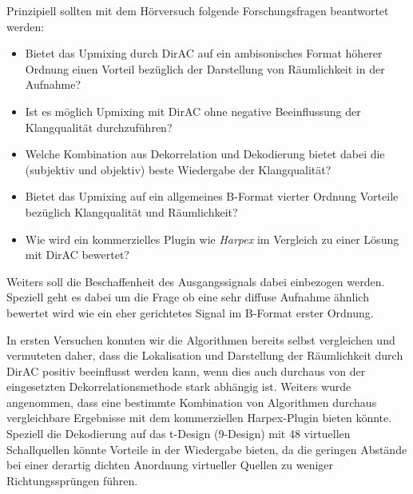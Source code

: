 Prinzipiell sollten mit dem Hörversuch folgende Forschungsfragen beantwortet werden:

\begin{itemize}
	\item Bietet das Upmixing durch DirAC auf ein ambisonisches Format höherer Ordnung einen Vorteil bezüglich der Darstellung von Räumlichkeit in der Aufnahme?
	\item Ist es möglich Upmixing mit DirAC ohne negative Beeinflussung der Klangqualität durchzuführen?
	\item Welche Kombination aus Dekorrelation und Dekodierung bietet dabei die (subjektiv und objektiv) beste Wiedergabe der Klangqualität?
	\item Bietet das Upmixing auf ein allgemeines B-Format vierter Ordnung Vorteile bezüglich Klangqualität und Räumlichkeit?
	\item Wie wird ein kommerzielles Plugin wie \textit{Harpex} im Vergleich zu einer Lösung mit DirAC bewertet?
\end{itemize}

Weiters soll die Beschaffenheit des Ausgangssignals dabei einbezogen werden. Speziell geht es dabei um die Frage ob eine sehr diffuse Aufnahme ähnlich bewertet wird wie ein eher gerichtetes Signal im B-Format erster Ordnung.

In ersten Versuchen konnten wir die Algorithmen bereits selbst vergleichen und vermuteten daher, dass die Lokalisation und Darstellung der Räumlichkeit durch DirAC positiv beeinflusst werden kann, wenn dies auch durchaus von der eingesetzten Dekorrelationsmethode stark abhängig ist. Weiters wurde angenommen, dass eine bestimmte Kombination von Algorithmen durchaus vergleichbare Ergebnisse mit dem kommerziellen Harpex-Plugin bieten könnte. Speziell die Dekodierung auf das t-Design (9-Design) mit 48 virtuellen Schallquellen könnte Vorteile in der Wiedergabe bieten, da die geringen Abstände bei einer derartig dichten Anordnung virtueller Quellen zu weniger Richtungssprüngen führen.
